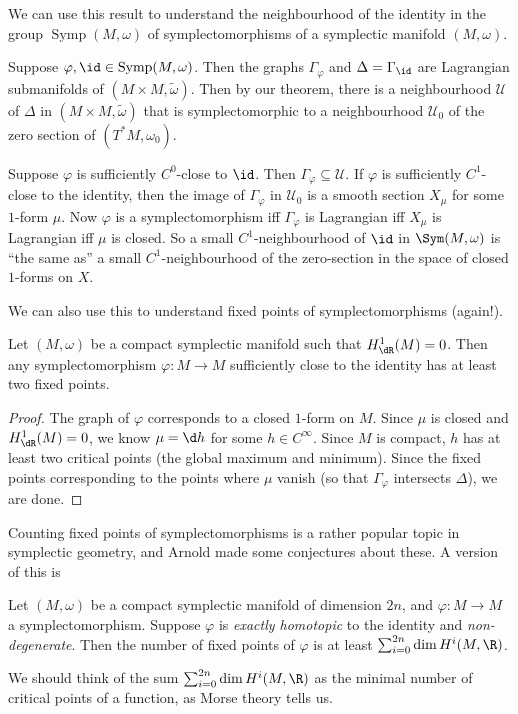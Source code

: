 \documentclass[a4paper]{article}
\DeclareMathOperator{\Symp}{Symp}
\begin{document}
\begin{eg}
  We can use this result to understand the neighbourhood of the identity in the group $\Symp(M, \omega)$ of symplectomorphisms of a symplectic manifold $(M, \omega)$.

  Suppose $\varphi, \id \in \Symp(M, \omega)$. Then the graphs $\Gamma_\varphi$ and $\Delta = \Gamma_{\id}$ are Lagrangian submanifolds of $(M \times M, \tilde{\omega})$. Then by our theorem, there is a neighbourhood $\mathcal{U}$ of $\Delta$ in $(M \times M, \tilde{\omega})$ that is symplectomorphic to a neighbourhood $\mathcal{U}_0$ of the zero section of $(T^*M, \omega_0)$.

  Suppose $\varphi$ is sufficiently $C^0$-close to $\id$. Then $\Gamma_\varphi \subseteq \mathcal{U}$. If $\varphi$ is sufficiently $C^1$-close to the identity, then the image of $\Gamma_\varphi$ in $\mathcal{U}_0$ is a smooth section $X_\mu$ for some $1$-form $\mu$.
  Now $\varphi$ is a symplectomorphism iff $\Gamma_\varphi$ is Lagrangian iff $X_\mu$ is Lagrangian iff $\mu$ is closed. So a small $C^1$-neighbourhood of $\id$ in $\Sym(M, \omega)$ is ``the same as'' a small $C^1$-neighbourhood of the zero-section in the space of closed $1$-forms on $X$.
\end{eg}

We can also use this to understand fixed points of symplectomorphisms (again!).
\begin{thm}
  Let $(M, \omega)$ be a compact symplectic manifold such that $H^1_{\dR}(M) = 0$. Then any symplectomorphism $\varphi: M \to M$ sufficiently close to the identity has at least two fixed points.
\end{thm}

\begin{proof}
  The graph of $\varphi$ corresponds to a closed $1$-form on $M$. Since $\mu$ is closed and $H^1_{\dR}(M) = 0$, we know $\mu = \d h$ for some $h \in C^\infty$. Since $M$ is compact, $h$ has at least two critical points (the global maximum and minimum). Since the fixed points corresponding to the points where $\mu$ vanish (so that $\Gamma_\varphi$ intersects $\Delta$), we are done.
\end{proof}
Counting fixed points of symplectomorphisms is a rather popular topic in symplectic geometry, and Arnold made some conjectures about these. A version of this is
\begin{thm} %
  Let $(M, \omega)$ be a compact symplectic manifold of dimension $2n$, and $\varphi: M \to M$ a symplectomorphism. Suppose $\varphi$ is \emph{exactly homotopic} to the identity and \emph{non-degenerate}. Then the number of fixed points of $\varphi$ is at least $\sum_{i = 0}^{2n} \dim H^i(M, \R)$.
\end{thm}
We should think of the sum $\sum_{i = 0}^{2n} \dim H^i(M, \R)$ as the minimal number of critical points of a function, as Morse theory tells us.
\end{document}
